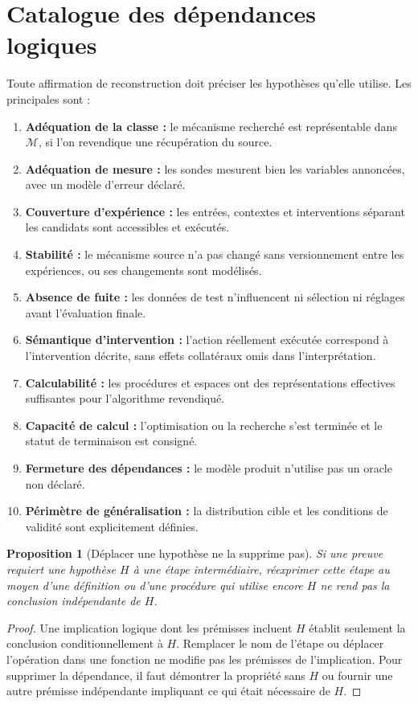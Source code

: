 \documentclass[11pt,oneside]{book}
\newtheorem{proposition}[theoreme]{Proposition}
\theoremstyle{definition}
\theoremstyle{remark}
\newcommand{\Mcal}{\mathcal M}
\newcommand{\1}{\mathbf 1}
\begin{document}
\section{Catalogue des dépendances logiques}
Toute affirmation de reconstruction doit préciser les hypothèses qu'elle utilise. Les principales sont :
\begin{enumerate}
\item \textbf{Adéquation de la classe :} le mécanisme recherché est représentable dans $\Mcal$, si l'on revendique une récupération du source.
\item \textbf{Adéquation de mesure :} les sondes mesurent bien les variables annoncées, avec un modèle d'erreur déclaré.
\item \textbf{Couverture d'expérience :} les entrées, contextes et interventions séparant les candidats sont accessibles et exécutés.
\item \textbf{Stabilité :} le mécanisme source n'a pas changé sans versionnement entre les expériences, ou ses changements sont modélisés.
\item \textbf{Absence de fuite :} les données de test n'influencent ni sélection ni réglages avant l'évaluation finale.
\item \textbf{Sémantique d'intervention :} l'action réellement exécutée correspond à l'intervention décrite, sans effets collatéraux omis dans l'interprétation.
\item \textbf{Calculabilité :} les procédures et espaces ont des représentations effectives suffisantes pour l'algorithme revendiqué.
\item \textbf{Capacité de calcul :} l'optimisation ou la recherche s'est terminée et le statut de terminaison est consigné.
\item \textbf{Fermeture des dépendances :} le modèle produit n'utilise pas un oracle non déclaré.
\item \textbf{Périmètre de généralisation :} la distribution cible et les conditions de validité sont explicitement définies.
\end{enumerate}

\begin{proposition}[Déplacer une hypothèse ne la supprime pas]
Si une preuve requiert une hypothèse $H$ à une étape intermédiaire, réexprimer cette étape au moyen d'une définition ou d'une procédure qui utilise encore $H$ ne rend pas la conclusion indépendante de $H$.
\end{proposition}
\begin{proof}
Une implication logique dont les prémisses incluent $H$ établit seulement la conclusion conditionnellement à $H$. Remplacer le nom de l'étape ou déplacer l'opération dans une fonction ne modifie pas les prémisses de l'implication. Pour supprimer la dépendance, il faut démontrer la propriété sans $H$ ou fournir une autre prémisse indépendante impliquant ce qui était nécessaire de $H$.\end{proof}
\end{document}
